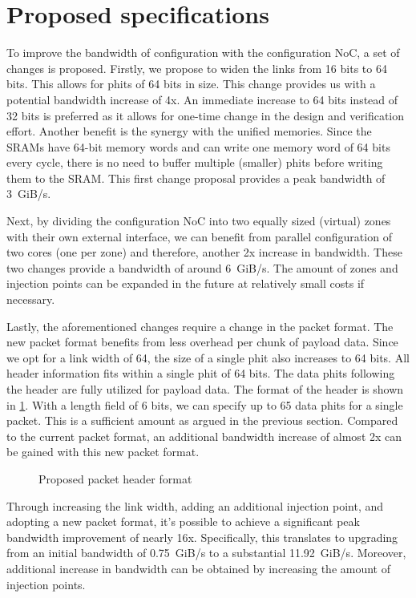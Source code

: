 \section{Proposed specifications}
\label{sec:proposed_noc}
To improve the bandwidth of configuration with the configuration NoC, a set of changes is proposed. Firstly, we propose to widen the links from 16 bits to 64 bits.
This allows for phits of 64 bits in size.
This change provides us with a potential bandwidth increase of 4x.
An immediate increase to 64 bits instead of 32 bits is preferred as it allows for one-time change in the design and verification effort.
Another benefit is the synergy with the unified memories.
Since the SRAMs have 64-bit memory words and can write one memory word of 64 bits every cycle, there is no need to buffer multiple (smaller) phits before writing them to the SRAM.
This first change proposal provides a peak bandwidth of \SI{3}{GiB/s}.

Next, by dividing the configuration NoC into two equally sized (virtual) zones with their own external interface, we can benefit from parallel configuration of two cores (one per zone) and therefore, another 2x increase in bandwidth.
These two changes provide a bandwidth of around \SI{6}{GiB/s}. 
The amount of zones and injection points can be expanded in the future at relatively small costs if necessary.

Lastly, the aforementioned changes require a change in the packet format.
The new packet format benefits from less overhead per chunk of payload data.
Since we opt for a link width of 64, the size of a single phit also increases to 64 bits.
All header information fits within a single phit of 64 bits.
The data phits following the header are fully utilized for payload data.
The format of the header is shown in \cref{fig:packet_format_header_new}.
With a length field of 6 bits, we can specify up to 65 data phits for a single packet.
This is a sufficient amount as argued in the previous section. 
Compared to the current packet format, an additional bandwidth increase of almost 2x can be gained with this new packet format.

\begin{figure}[hbtp]
    \centering
    \resizebox{\linewidth}{!}{
        
    }
    \caption{Proposed packet header format}
    \label{fig:packet_format_header_new}
\end{figure}

Through increasing the link width, adding an additional injection point, and adopting a new packet format, it’s possible to achieve a significant peak bandwidth improvement of nearly 16x.
Specifically, this translates to upgrading from an initial bandwidth of \SI{0.75}{GiB/s} to a substantial \SI{11.92}{GiB/s}.
Moreover, additional increase in bandwidth can be obtained by increasing the amount of injection points.

